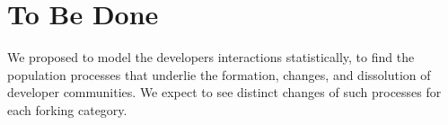 \documentclass[11pt]{report}
\begin{document}
%
%
%
%
%

\pagebreak

\section{To Be Done}
\label{YetToBeDone}

We proposed to model the developers interactions statistically, to find the population processes that underlie the formation, changes, and dissolution of developer communities. We expect to see distinct changes of such processes for each forking category.
\end{document}
